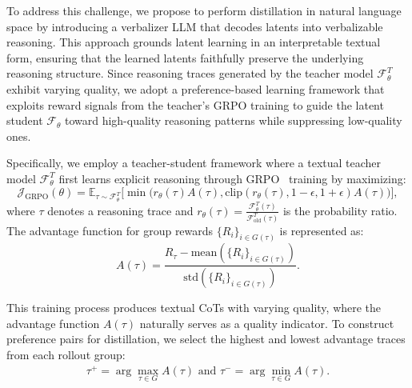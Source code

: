 To address this challenge, we propose to perform distillation in natural language space by introducing a verbalizer LLM that decodes latents into verbalizable reasoning. This approach grounds latent learning in an interpretable textual form, ensuring that the learned latents faithfully preserve the underlying reasoning structure. Since reasoning traces generated by the teacher model $\mathcal{F}_\theta^T$ exhibit varying quality, we adopt a preference-based learning framework that exploits reward signals from the teacher's GRPO training to guide the latent student $\mathcal{F}_\theta$ toward high-quality reasoning patterns while suppressing low-quality ones.


Specifically, we employ a teacher-student framework where a textual teacher model $\mathcal{F}_\theta^T$ first learns explicit reasoning through GRPO~\cite{shao2024deepseekmath} training by maximizing:
\begin{equation}
    \mathcal{J}_\text{GRPO}(\theta) = \mathbb{E}_{\tau\sim\mathcal{F}^T_\theta}\Big[ \min \big( r_\theta(\tau)A(\tau), \text{clip}(r_\theta(\tau), 1-\epsilon, 1+\epsilon )A(\tau) \big) \Big],
\end{equation}
where $\tau$ denotes a reasoning trace and $r_\theta(\tau) = \frac{\mathcal{F}^T_\theta(\tau)}{\mathcal{F}^T_{\text{old}}(\tau)}$ is the probability ratio. The advantage function for group rewards $\{ R_i \}_{i\in G(\tau)}$ is represented as:
\begin{equation}
     A(\tau)=\frac{R_\tau - \text{mean}(\{ R_i \}_{i\in G(\tau)})}{\text{std}(\{ R_i \}_{i\in G(\tau)})}.
\end{equation}

This training process produces textual CoTs with varying quality, where the advantage function $A(\tau)$ naturally serves as a quality indicator. To construct preference pairs for distillation, we select the highest and lowest advantage traces from each rollout group:
\begin{align}
\tau^+ = \arg\max_{\tau \in G} A(\tau) \text{ and } \tau^- = \arg\min_{\tau \in G} A(\tau).
\end{align}

